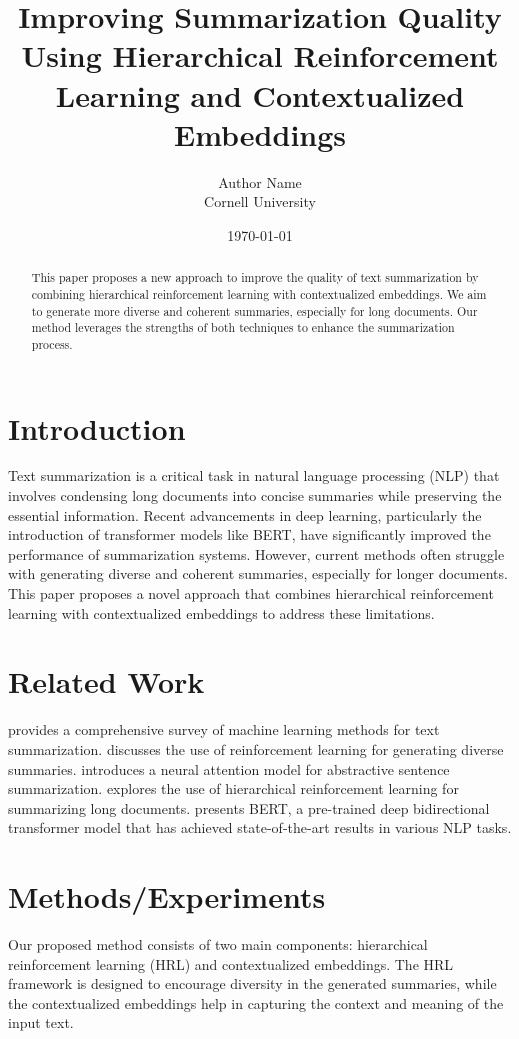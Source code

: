 \documentclass{article}
\title{Improving Summarization Quality Using Hierarchical Reinforcement Learning and Contextualized Embeddings}
\author{Author Name \\ Cornell University}
\date{\today}
\begin{document}
\maketitle

\begin{abstract}
This paper proposes a new approach to improve the quality of text summarization by combining hierarchical reinforcement learning with contextualized embeddings. We aim to generate more diverse and coherent summaries, especially for long documents. Our method leverages the strengths of both techniques to enhance the summarization process.
\end{abstract}

\section{Introduction}
Text summarization is a critical task in natural language processing (NLP) that involves condensing long documents into concise summaries while preserving the essential information. Recent advancements in deep learning, particularly the introduction of transformer models like BERT, have significantly improved the performance of summarization systems. However, current methods often struggle with generating diverse and coherent summaries, especially for longer documents. This paper proposes a novel approach that combines hierarchical reinforcement learning with contextualized embeddings to address these limitations.

\section{Related Work}
\cite{joshi2017survey} provides a comprehensive survey of machine learning methods for text summarization. \cite{dodge2018learning} discusses the use of reinforcement learning for generating diverse summaries. \cite{rush2015neural} introduces a neural attention model for abstractive sentence summarization. \cite{gupta2019summarizing} explores the use of hierarchical reinforcement learning for summarizing long documents. \cite{devlin2019bert} presents BERT, a pre-trained deep bidirectional transformer model that has achieved state-of-the-art results in various NLP tasks.

\section{Methods/Experiments}
Our proposed method consists of two main components: hierarchical reinforcement learning (HRL) and contextualized embeddings. The HRL framework is designed to encourage diversity in the generated summaries, while the contextualized embeddings help in capturing the context and meaning of the input text.
\end{document}
